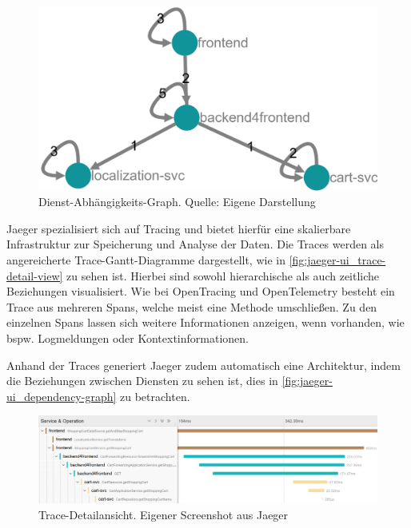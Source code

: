 \begin{figure}
\centering
\includegraphics[width=\linewidth]{img/03_methoden/jaeger_dependency-graph.png}
\caption{Dienst-Abhängigkeits-Graph. Quelle: Eigene Darstellung}
\label{fig:jaeger-ui_dependency-graph}
\end{figure}

Jaeger spezialisiert sich auf Tracing und bietet hierfür eine skalierbare Infrastruktur zur Speicherung und Analyse der Daten. Die Traces werden als angereicherte Trace-Gantt-Diagramme dargestellt, wie in \autoref{fig:jaeger-ui_trace-detail-view} zu sehen ist. Hierbei sind sowohl hierarchische als auch zeitliche Beziehungen visualisiert. Wie bei OpenTracing und OpenTelemetry besteht ein Trace aus mehreren Spans, welche meist eine Methode umschließen. Zu den einzelnen Spans lassen sich weitere Informationen anzeigen, wenn vorhanden, wie bspw. Logmeldungen oder Kontextinformationen.

Anhand der Traces generiert Jaeger zudem automatisch eine Architektur, indem die Beziehungen zwischen Diensten zu sehen ist, dies in \autoref{fig:jaeger-ui_dependency-graph} zu betrachten.

\begin{figure}[H]
	\centering
	\includegraphics[width=\linewidth]{img/03_methoden/jaeger_trace-detail-view.png}
	\caption{Trace-Detailansicht. Eigener Screenshot aus Jaeger}
	\label{fig:jaeger-ui_trace-detail-view}
\end{figure}

